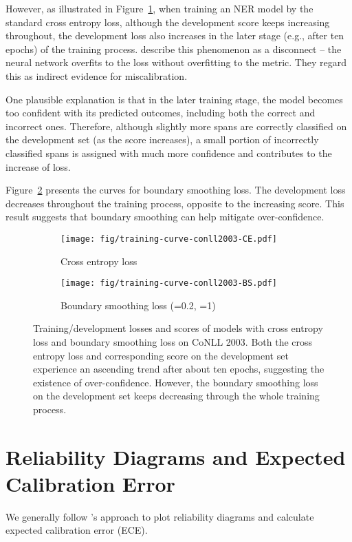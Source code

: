 \documentclass[11pt]{article}
\begin{document}
However, as illustrated in Figure~\ref{subfig:training-curves-ce}, when training an NER model by the standard cross entropy loss, although the development  score keeps increasing throughout, the development loss also increases in the later stage (e.g., after ten epochs) of the training process. \citet{guo2017calibration} describe this phenomenon as a disconnect -- the neural network overfits to the loss without overfitting to the metric. They regard this as indirect evidence for miscalibration. 

One plausible explanation is that in the later training stage, the model becomes too confident with its predicted outcomes, including both the correct and incorrect ones. Therefore, although slightly more spans are correctly classified on the development set (as the  score increases), a small portion of incorrectly classified spans is assigned with much more confidence and contributes to the increase of loss. 

Figure~\ref{subfig:training-curves-bs} presents the curves for boundary smoothing loss. The development loss decreases throughout the training process, opposite to the increasing  score. This result suggests that boundary smoothing can help mitigate over-confidence. 

\begin{figure}[t]
    \centering
    \begin{subfigure}{\columnwidth}
    \centering
    \texttt{[image: fig/training-curve-conll2003-CE.pdf]}
    \caption{Cross entropy loss}
    \label{subfig:training-curves-ce}
    \end{subfigure}
    \begin{subfigure}{\columnwidth}
    \centering
    \texttt{[image: fig/training-curve-conll2003-BS.pdf]}
    \caption{Boundary smoothing loss (=0.2, =1)}
    \label{subfig:training-curves-bs}
    \end{subfigure}
    \caption{Training/development losses and  scores of models with cross entropy loss and boundary smoothing loss on CoNLL 2003. Both the cross entropy loss and corresponding  score on the development set experience an ascending trend after about ten epochs, suggesting the existence of over-confidence. However, the boundary smoothing loss on the development set keeps decreasing through the whole training process.}
    \label{fig:training-curves}
\end{figure}


\section{Reliability Diagrams and Expected Calibration Error} \label{sec:calibration}
We generally follow \citet{guo2017calibration}'s approach to plot reliability diagrams and calculate expected calibration error (ECE). 
\end{document}
